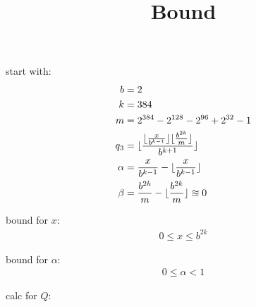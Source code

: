 \documentclass{article}
\title{Bound}
\date{}
\DeclarePairedDelimiter\floor{\lfloor}{\rfloor}
\begin{document}

start with:
\begin{align*}
    b &= 2 \\
    k &= 384 \\
    m &= 2^{384} - 2^{128} - 2^{96} + 2^{32} - 1\\
    q_3 &=  \floor{
        \frac
        {
            \floor{\frac{x}{b^{k-1}}} \floor{\frac{b^{2k}}{m}}
        }
        {b ^{k+1}}
        }\\
    \alpha &= \frac{x}{b^{k-1}} - \floor{\frac{x}{b^{k-1}}}\\
    \beta &= \frac{b^{2k}}{m} - \floor{\frac{b^{2k}}{m}} \approxeq 0
\end{align*}

bound for $x$:
\begin{align*}
0 \le x \le b^{2k}
\end{align*}

bound for $\alpha$:
\begin{align*}
0 \le  \alpha < 1
\end{align*}

calc for $Q$:
\end{document}

